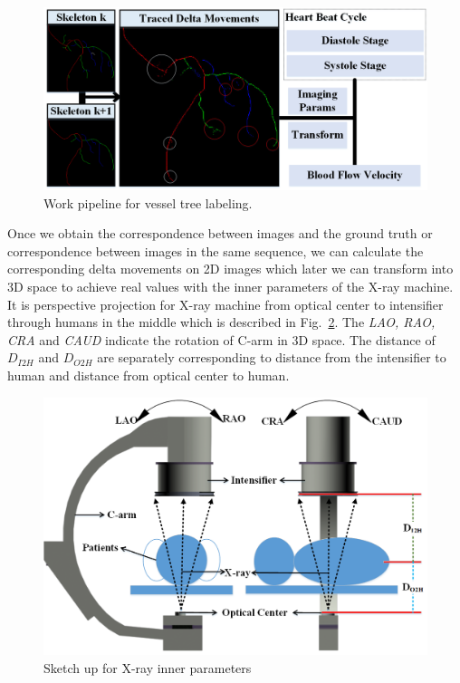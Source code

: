 \documentclass[journal]{IEEEtran}
\begin{document}
\begin{figure}[!t]
\centering
\includegraphics[width=1.0\linewidth]{./images/application-pipeline.png}
\caption{Work pipeline for vessel tree labeling.}
\label{fig:application-pipline}
\end{figure}

Once we obtain the correspondence between images and the ground truth or correspondence between images in the same sequence, we can calculate the corresponding delta movements on 2D images which later we can transform into 3D space to achieve real values with the inner parameters of the X-ray machine. It is perspective projection for X-ray machine from optical center to intensifier through humans in the middle which is described in Fig.~\ref{fig:application-sketchup}. The \textit{LAO, RAO, CRA} and \textit{CAUD} indicate the rotation of C-arm in 3D space. The distance of $D_{I2H}$ and $D_{O2H}$ are separately corresponding to distance from the intensifier to human and distance from optical center to human.

\begin{figure}[!t]
\centering
\includegraphics[width=1.0\linewidth]{./images/laorao.png}
\caption{Sketch up for X-ray inner parameters}
\label{fig:application-sketchup}
\end{figure}
\end{document}
